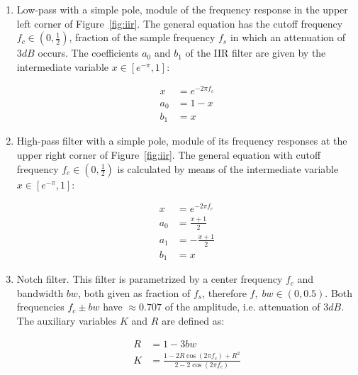 \begin{enumerate}
  \item Low-pass with a simple pole, module of the frequency response in the upper left corner of Figure~\ref{fig:iir}. The general equation has the cutoff frequency $f_c \in (0,\frac{1}{2})$, fraction of the sample frequency $f_s$ in which an attenuation of $3dB$ occurs. The coefficients $a_0$ and $b_1$ of the IIR filter are given by the intermediate variable $x \in [e^{-\pi},1]$:

\begin{equation}\label{eq:passa-baixas}
 \begin{split}
 x & =e^{-2\pi f_c} \\
 a_0 & =  1-x \\
 b_1 & =  x
 \end{split}
\end{equation}

  \item High-pass filter with a simple pole, module of its frequency responses at the upper right corner of Figure~\ref{fig:iir}. The general equation with cutoff frequency $f_c \in (0,\frac{1}{2})$ is calculated by means of the intermediate variable $x \in [e^{-\pi},1]$:

\begin{equation}\label{eq:passa-altas}
 \begin{split}
 x & =e^{-2\pi f_c} \\
 a_0 & =  \frac{x+1}{2} \\
 a_1 & =  -\frac{x+1}{2} \\
 b_1 & =  x
 \end{split}
\end{equation}


\item Notch filter. This filter is parametrized by a center frequency $f_c$ and bandwidth $bw$, both given as fraction of $f_s$, therefore $f,\; bw \in (0,0.5)$. Both frequencies $f_c \pm bw$ have $\approx 0.707$ of the amplitude, i.e. attenuation of $3dB$. The auxiliary variables $K$ and $R$ are defined as:

\begin{equation}\label{eq:varAux}
 \begin{split}
  R & = 1 - 3bw \\
  K & = \frac{1-2R\cos(2\pi f_c) + R^2}{2 - 2 \cos (2 \pi f_c)}
 \end{split}
\end{equation}


\end{enumerate}

